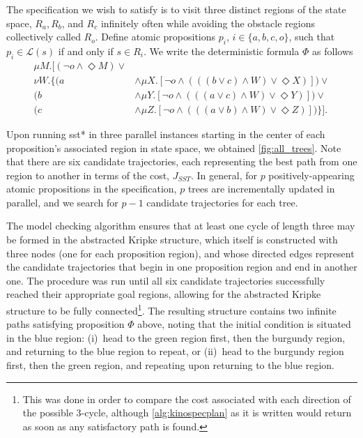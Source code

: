 The specification we wish to satisfy is to visit three distinct regions of the state space,
$R_a, R_b$, and $R_c$ infinitely often while avoiding the obstacle regions collectively called $R_o$. Define atomic propositions $p_i$, $i \in \{a, b, c, o\}$, such that ${p_i} \in \mathcal{L}(s)$ if and only if $s \in R_i$. We write the deterministic \mucalc{} formula $\Phi$ as follows
\begin{align*}
    \mu M.[  (\lnot o \land \Diamond M) \lor \\
        \nu W.\{
            ( a &\land \mu X.[\lnot o \land ( ((b \lor c) \land W) \lor \Diamond X)] ) \lor \\
            ( b &\land \mu Y.[\lnot o \land ( ((a \lor c) \land W) \lor \Diamond Y)] ) \lor \\
            ( c &\land \mu Z.[\lnot o \land ( ((a \lor b) \land W) \lor \Diamond Z)] ) \} ].
\end{align*}

Upon running \gls{sst}* in three parallel instances starting in the center of each proposition's associated region in state space, we obtained \autoref{fig:all_trees}. Note that there are six candidate trajectories, each representing the best path from one region to another in terms of the cost, $J_{SST}$. In general, for $p$ positively-appearing atomic propositions in the {\mucalc{}} specification, $p$ trees are incrementally updated in parallel, and we search for ${p-1}$ candidate trajectories for each tree.

The model checking algorithm ensures that at least one cycle of length three may be formed in the abstracted Kripke structure, which itself is constructed with three nodes (one for each proposition region), and whose directed edges represent the candidate trajectories that begin in one proposition region and end in another one. The procedure was run until all six candidate trajectories successfully reached their appropriate goal regions, allowing for the abstracted Kripke structure to be fully connected\footnote{This was done in order to compare the cost associated with each direction of the possible 3-cycle, although \autoref{alg:kinospecplan} as it is written would return as soon as any satisfactory path is found.}. The resulting structure contains two infinite paths satisfying proposition $\Phi$ above, noting that the initial condition is situated in the blue region: (i)\ head to the green region first, then the burgundy region, and returning to the blue region to repeat, or (ii)\ head to the burgundy region first, then the green region, and repeating upon returning to the blue region.

